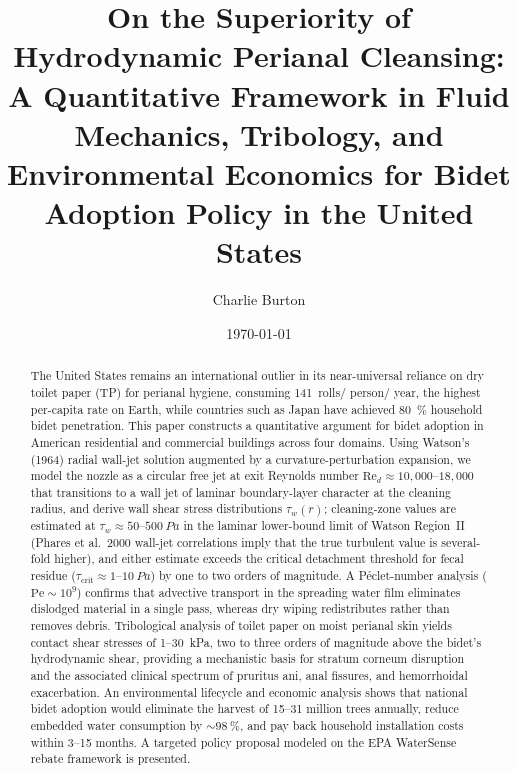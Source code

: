 \documentclass[10pt,letterpaper]{article}
\newcommand{\Rey}{\mathrm{Re}}
\newcommand{\Pe}{\mathrm{Pe}}
\begin{document}
\title{On the Superiority of Hydrodynamic Perianal Cleansing: A
       Quantitative Framework in Fluid Mechanics, Tribology, and
       Environmental Economics for Bidet Adoption Policy in the
       United States}

\author{Charlie Burton}

\date{\today}

\begin{abstract}
The United States remains an international outlier in its near-universal
reliance on dry toilet paper (TP) for perianal hygiene, consuming
141~rolls/ person/ year, the highest per-capita rate on
Earth, while countries such as Japan have achieved 80~\% household
bidet penetration. This paper constructs a quantitative argument
for bidet adoption in American residential and commercial buildings across
four domains. Using Watson's (1964) radial wall-jet solution augmented by a
curvature-perturbation expansion, we model the nozzle as a circular
free jet at exit Reynolds number $\Rey_d \approx 10{,}000$--$18{,}000$
that transitions to a wall jet of laminar boundary-layer character at
the cleaning radius, and derive wall shear stress
distributions $\tau_w(r)$; cleaning-zone values are estimated at
$\tau_w \approx 50$--$500~Pa$ in the laminar lower-bound limit
of Watson Region~II (Phares et al.~2000 wall-jet correlations imply
that the true turbulent value is several-fold higher), and either
estimate exceeds the critical detachment threshold for fecal residue
($\tau_\mathrm{crit} \approx 1$--$10~Pa$) by one to two orders
of magnitude. A P\'{e}clet-number analysis ($\Pe \sim 10^9$)
confirms that advective transport in the spreading water film eliminates
dislodged material in a single pass, whereas dry wiping redistributes
rather than removes debris. Tribological analysis of toilet paper on moist
perianal skin yields contact shear stresses of 1--30~kPa, two to
three orders of magnitude above the bidet's hydrodynamic shear, providing
a mechanistic basis for stratum corneum disruption and the associated
clinical spectrum of pruritus ani, anal fissures, and hemorrhoidal
exacerbation. An environmental lifecycle and economic analysis shows that
national bidet adoption would eliminate the harvest of 15--31 million trees
annually, reduce embedded water consumption by $\sim98~\%$, and pay
back household installation costs within 3--15 months. A targeted policy
proposal modeled on the EPA WaterSense rebate framework is presented.
\end{abstract}
\end{document}
